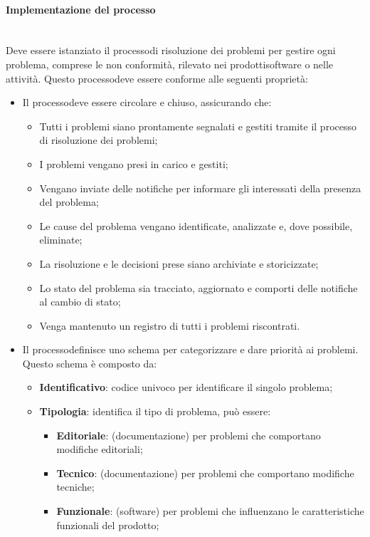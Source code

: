 \paragraph{Implementazione del processo}\mbox{}\\ [1mm]
Deve essere istanziato il processo\glosp di risoluzione dei problemi per gestire ogni problema, comprese le non conformità, rilevato nei prodotti\glosp software o nelle attività. Questo processo\glosp deve essere conforme alle seguenti proprietà:
\begin{itemize}
	\item Il processo\glosp deve essere circolare e chiuso, assicurando che:
	\begin{itemize} 
		\item Tutti i problemi siano prontamente segnalati e gestiti tramite il processo di risoluzione dei problemi;
		\item I problemi vengano presi in carico e gestiti;
		\item Vengano inviate delle notifiche per informare gli interessati della presenza del problema;
		\item Le cause del problema vengano identificate, analizzate e, dove possibile, eliminate;
		\item La risoluzione e le decisioni prese siano archiviate e storicizzate;
		\item Lo stato del problema sia tracciato, aggiornato e comporti delle notifiche al cambio di stato;
		\item Venga mantenuto un registro di tutti i problemi riscontrati.
	\end{itemize}
	\item Il processo\glosp definisce uno schema per categorizzare e dare priorità ai problemi. Questo schema è composto da:
	\begin{itemize} 
		\item \textbf{Identificativo}: codice univoco per identificare il singolo problema;
		\item \textbf{Tipologia}: identifica il tipo di problema, può essere:
		\begin{itemize}
			\item \textbf{Editoriale}: (documentazione) per problemi che comportano modifiche editoriali\glo;
			\item \textbf{Tecnico}: (documentazione) per problemi che comportano modifiche tecniche\glo;
			\item \textbf{Funzionale}: (software) per problemi che influenzano le caratteristiche funzionali del prodotto\glo;

\end{itemize}
\end{itemize}
\end{itemize}
